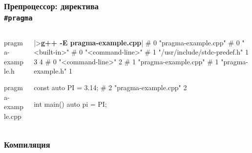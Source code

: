 \documentclass[compress]{beamer}
\newcommand{\shellprompt}{>}
\newcommand{\shellcommand}[1]{\shellprompt \space \textbf{#1}}
\begin{document}
\begin{frame}[fragile]

    \frametitle{Препроцессор: директива \\ \texttt{\#pragma}}

    \begin{columns}[T]

        \begin{column}{0.5\textwidth}

                {pragma-example.h}

                {pragma-example.cpp}

        \end{column}

        \begin{column}{0.5\textwidth}

            \begin{ConsoleWindow}
|\shellcommand{g++ -E pragma-example.cpp}|
# 0 "pragma-example.cpp"
# 0 "<built-in>"
# 0 "<command-line>"
# 1 "/usr/include/stdc-predef.h" 1 3 4
# 0 "<command-line>" 2
# 1 "pragma-example.cpp"
# 1 "pragma-example.h" 1


const auto PI = 3.14;
# 2 "pragma-example.cpp" 2




int main() {
    auto pi = PI;
}
            \end{ConsoleWindow}

        \end{column}

    \end{columns}

\end{frame}

\begin{frame}

    \frametitle{Компиляция}

    \centering


\end{frame}
\end{document}
